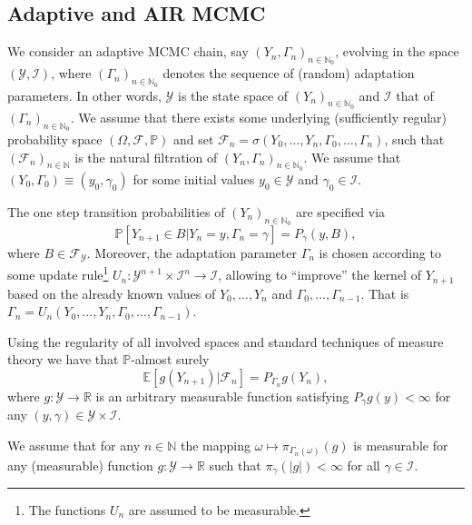 \documentclass[12pt]{article}
\theoremstyle{definition}
\newcommand{\N}{\mathbb{N}}
\newcommand{\E}{\mathbb{E}}
\newcommand{\R}{\mathbb{R}}
\newcommand{\cY}{\mathcal{Y}}
\newcommand{\cF}{\mathcal{F}}
\begin{document}
\subsection{Adaptive and AIR MCMC}\label{subsec:AIR_MCMC} 
We consider an adaptive MCMC chain, say $(Y_n, \Gamma_n)_{n \in \N_0}$, evolving in the space $(\cY, \mathcal{I})$, where $(\Gamma_n)_{n \in \N_0}$ denotes the sequence of (random) adaptation parameters. 
In other words, $\cY$ is the state space of $(Y_n)_{n \in \N_0}$ and $\mathcal{I}$ that of $(\Gamma_n)_{n \in \N_0}$.  
We assume that there exists some underlying (sufficiently regular) probability space $(\Omega, \mathcal{F}, \mathbb{P})$ and set $\mathcal{F}_{n} = \sigma\left(Y_0 , \dots, Y_n , \Gamma_0 , \dots, \Gamma_n \right)$, such that $(\mathcal{F}_n)_{n \in \N}$ is the natural filtration of $(Y_n, \Gamma_n)_{n\in \N_0}$.
We assume that $(Y_0, \Gamma_0) \equiv (y_0, \gamma_0 )$ for some initial values $y_0 \in \cY$ and $\gamma_0 \in \mathcal{I}$. 


The one step transition probabilities of $(Y_n )_{n \in \N_0}$ are specified via 
\begin{equation}\label{equ:adaptive_MCMC_dynamics}
	\mathbb{P}\left[Y_{n+1} \in B \vert Y_n = {y}, \Gamma_n= \gamma \right] = {P}_\gamma(y, B),
\end{equation}
where $B \in \cF_{\cY}$. 
Moreover, the adaptation parameter $\Gamma_n$ is chosen according to some update rule\footnote{The functions $U_n$ are assumed to be measurable.} $U_n \colon \cY^{n+1} \times \mathcal{I}^n \to \mathcal{I}$, allowing to ``improve'' the kernel of $Y_{n+1}$ based on the already known values of $Y_0, \dots, Y_n$ and $\Gamma_0, \dots, \Gamma_{n-1}$. 
That is $\Gamma_n = U_n (Y_0, \dots, Y_n , \Gamma_0 , \dots,\Gamma_{n-1})$.



Using the regularity of all involved spaces and standard techniques of measure theory we have that $\mathbb{P}$-almost surely
\begin{equation}\label{equ:conditional_expectation}
	\E \left[g (Y_{n+1}) \vert \cF_{n}\right] = P_{\Gamma_n} g (Y_n),
\end{equation}
where $g \colon \cY \to \R$ is an arbitrary measurable function satisfying $P_\gamma g(y) < \infty$ for any $(y,\gamma)\in\cY\times\mathcal{I}$.


We assume that for any $n \in \N$ the mapping $\omega \mapsto \pi_{\Gamma_n(\omega)}(g)$ is measurable for any (measurable) function $g \colon \cY \to \R$ such that $\pi_\gamma (\vert g\vert ) < \infty$ for all $\gamma \in \mathcal{I}$.
\end{document}
